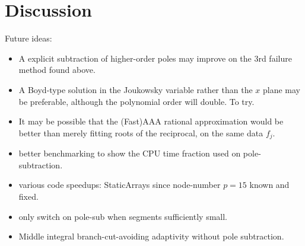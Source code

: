\documentclass[11pt]{article}
\newcommand{\bi}{\begin{itemize}}
\newcommand{\ei}{\end{itemize}}
\begin{document}
\section{Discussion}


Future ideas:
\bi
\item A explicit subtraction of higher-order poles may improve on the 3rd
  failure method found above.
\item A Boyd-type solution in the Joukowsky variable rather than the $x$ plane
  may be preferable, although the polynomial order will double. To try.
\item It may be possible that the (Fast)AAA rational approximation would be
  better than merely fitting roots of the reciprocal, on the same data $f_j$.
\item better benchmarking to show the CPU time fraction used on pole-subtraction.
\item various code speedups: StaticArrays since node-number $p=15$ known and fixed.
\item only switch on pole-sub when segments sufficiently small.
\item Middle integral branch-cut-avoiding adaptivity without pole subtraction.
\ei



\end{document}
